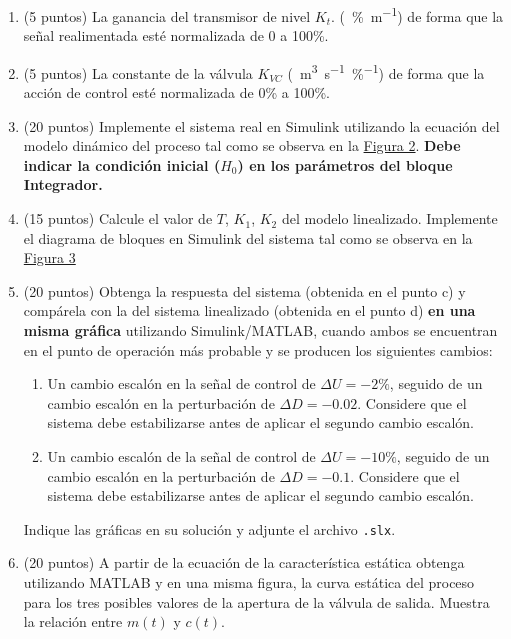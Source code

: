 \begin{enumerate}[label=\alph*), start=2]
    \item (5 puntos) La ganancia del transmisor de nivel $K_t$. (\SI{}{\%\metre\tothe{-1}}) de forma que la señal
realimentada esté normalizada de 0 a 100\%.


    \item (5 puntos) La constante de la válvula $K _{VC}$ (\SI{}{\metre\cubed\second\tothe{-1}\%\tothe{-1}}) de forma que la acción de control esté normalizada de 0\% a 100\%.


    \item (20 puntos) Implemente el sistema real en Simulink utilizando la ecuación del modelo
        dinámico del proceso tal como se observa en la \hyperref[fig2]{Figura 2}. \textbf{Debe indicar la condición inicial ($H_0$) en los parámetros del bloque Integrador.}

    \item (15 puntos) Calcule el valor de $T$, $K_1$, $K_2$ del modelo linealizado. Implemente el diagrama de bloques en Simulink del sistema tal como se observa en la \hyperref[fig3]{Figura 3}


    \item (20 puntos) Obtenga la respuesta del sistema (obtenida en el punto c) y compárela con la del sistema linealizado (obtenida en el punto d) \textbf{en una misma gráfica} utilizando Simulink/MATLAB, cuando ambos se encuentran en el punto de operación más probable y se producen los siguientes cambios:
        \begin{enumerate}[label=\roman*.]
            \item Un cambio escalón en la señal de control de $\Delta U = -2\%$, seguido de un cambio escalón en la perturbación de $\Delta D = -0.02$.
                Considere que el sistema debe estabilizarse antes de aplicar el segundo cambio escalón.
            \item Un cambio escalón de la señal de control de $\Delta U = -10\%$, seguido de un cambio escalón en la perturbación de $\Delta D = -0.1$. Considere que el sistema debe estabilizarse antes de aplicar el segundo cambio escalón.
        \end{enumerate}
        Indique las gráficas en su solución y adjunte el archivo \texttt{.slx}.

        
    \item (20 puntos) A partir de la ecuación de la característica estática obtenga utilizando MATLAB
y en una misma figura, la curva estática del proceso para los tres posibles valores de la
apertura de la válvula de salida. Muestra la relación entre $m(t)$ y $c(t)$. 


\end{enumerate}
